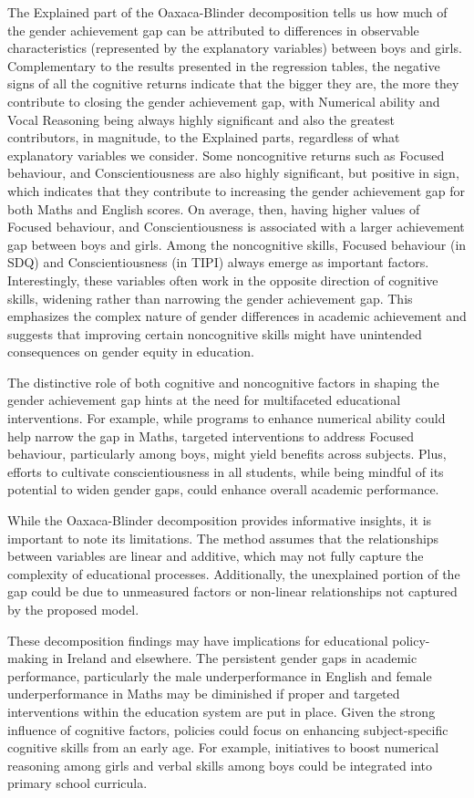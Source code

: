 \documentclass[12pt,a4paper,onecolumn]{article}
\numberwithin{equation}{section}
\begin{document}
The Explained part of the Oaxaca-Blinder decomposition tells us how much of the gender achievement gap can be attributed to differences in observable characteristics (represented by the explanatory variables) between boys and girls. Complementary to the results presented in the regression tables, the negative signs of all the cognitive returns indicate that the bigger they are, the more they contribute to closing the gender achievement gap, with Numerical ability and Vocal Reasoning being always highly significant and also the greatest contributors, in magnitude, to the Explained parts, regardless of what explanatory variables we consider. Some noncognitive returns such as Focused behaviour, and Conscientiousness are also highly significant, but positive in sign, which indicates that they contribute to increasing the gender achievement gap for both Maths and English scores. On average, then, having higher values of Focused behaviour, and Conscientiousness is associated with a larger achievement gap between boys and girls.
Among the noncognitive skills, Focused behaviour (in SDQ) and Conscientiousness (in TIPI) always emerge as important factors. Interestingly, these variables often work in the opposite direction of cognitive skills, widening rather than narrowing the gender achievement gap. This emphasizes the complex nature of gender differences in academic achievement and suggests that improving certain noncognitive skills might have unintended consequences on gender equity in education. 

The distinctive role of both cognitive and noncognitive factors in shaping the gender achievement gap hints at the need for multifaceted educational interventions. For example, while programs to enhance numerical ability could help narrow the gap in Maths, targeted interventions to address Focused behaviour, particularly among boys, might yield benefits across subjects. Plus, efforts to cultivate conscientiousness in all students, while being mindful of its potential to widen gender gaps, could enhance overall academic performance.

While the Oaxaca-Blinder decomposition provides informative insights, it is important to note its limitations. The method assumes that the relationships between variables are linear and additive, which may not fully capture the complexity of educational processes. Additionally, the unexplained portion of the gap could be due to unmeasured factors or non-linear relationships not captured by the proposed model. 

These decomposition findings may have implications for educational policy-making in Ireland and elsewhere. The persistent gender gaps in academic performance, particularly the male underperformance in English and female underperformance in Maths may be diminished if proper and targeted interventions within the education system are put in place. Given the strong influence of cognitive factors, policies could focus on enhancing subject-specific cognitive skills from an early age. For example, initiatives to boost numerical reasoning among girls and verbal skills among boys could be integrated into primary school curricula.
\end{document}
